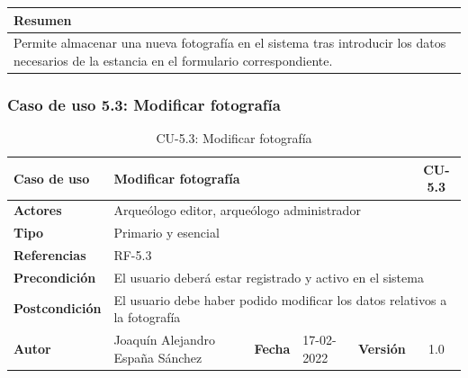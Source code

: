     \begin{table}[H]
        \centering
        \begin{tabularx}{\textwidth}{@{} |L |@{}} \hline
            \textbf{Resumen} \\
            \hline
            Permite almacenar una nueva fotografía en el sistema tras introducir los datos
            necesarios de la estancia en el formulario correspondiente.\\
            \hline
        \end{tabularx}
    \end{table}

\subsubsection{Caso de uso 5.3: Modificar fotografía}

    \begin{table}[H]
    \begin{center}
        \begin{adjustbox}{width=\textwidth}
        \begin{tabular}{ | l | l | l | l | c | c | } 
            \hline
            \textbf{Caso de uso} & \multicolumn{4}{l|}{Modificar fotografía} & \cellcolor{gray!50} \textbf{CU-5.3}\\
            \hline
            \textbf{Actores} & \multicolumn{5}{p{0.9\linewidth}|}{Arqueólogo editor, arqueólogo administrador} \\
            \hline
            \textbf{Tipo} & \multicolumn{5}{l|}{Primario y esencial} \\
            \hline
            \textbf{Referencias} & \multicolumn{3}{l|}{RF-5.3} & \multicolumn{2}{l|}{ }\\
            \hline
            \textbf{Precondición} & \multicolumn{5}{l|}{El usuario deberá estar registrado y activo en el sistema} \\
            \hline
            \textbf{Postcondición} & \multicolumn{5}{l|}{El usuario debe haber podido modificar los datos relativos a la fotografía} \\
            \hline
            \textbf{Autor} & \multicolumn{1}{p{0.25\linewidth}|}{Joaquín Alejandro España Sánchez} & \textbf{Fecha} & 
            17-02-2022     & \textbf{Versión}                                                      & 1.0\\
            \hline
        \end{tabular}
        \end{adjustbox}
        \caption{CU-5.3: Modificar fotografía}
        \label{tab:modify-photo}
    \end{center}
    \end{table}

